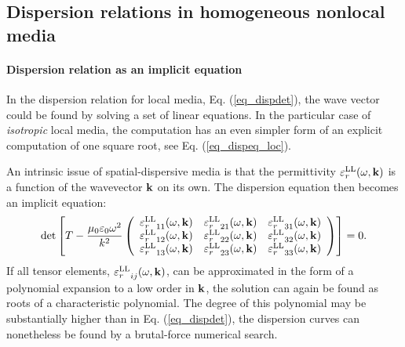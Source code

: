 \subsection{Dispersion relations in homogeneous nonlocal media} 
\paragraph{Dispersion relation as an implicit equation} %
In the dispersion relation for local media, Eq. (\ref{eq_dispdet}), the wave vector could be found by solving a set of linear equations. In the particular case of \textit{isotropic} local media, the computation has an even simpler form of an explicit computation of one square root, see Eq. (\ref{eq_dispeq_loc}).

An intrinsic issue of spatial-dispersive media is that the permittivity $\varepsilon_r^\text{LL}(\omega,{\mathbf{k}})$ is a function of the wavevector ${\mathbf{k}}$ on its own. The dispersion equation then becomes an implicit equation: 
\begin{equation} 
\det\left[
T -
	\frac{\mu_0 \varepsilon_0 \omega^2}{k^2}
	\left(\begin{array}{ccc} 
	{\varepsilon_r^\text{LL}}_{11}(\omega,{\mathbf{k}}) & {\varepsilon_r^\text{LL}}_{21}(\omega,{\mathbf{k}}) & {\varepsilon_r^\text{LL}}_{31}(\omega,{\mathbf{k}})  \\
	{\varepsilon_r^\text{LL}}_{12}(\omega,{\mathbf{k}}) & {\varepsilon_r^\text{LL}}_{22}(\omega,{\mathbf{k}}) & {\varepsilon_r^\text{LL}}_{32}(\omega,{\mathbf{k}})  \\
	{\varepsilon_r^\text{LL}}_{13}(\omega,{\mathbf{k}}) & {\varepsilon_r^\text{LL}}_{23}(\omega,{\mathbf{k}}) & {\varepsilon_r^\text{LL}}_{33}(\omega,{\mathbf{k}})  
	\end{array} \right) \right] = 0. \label{eq_dispdetLL}\end{equation}
If all tensor elements, ${\varepsilon_r^\text{LL}}_{ij}(\omega,{\mathbf{k}})$, can be approximated in the form of a polynomial expansion to a low order in ${\mathbf{k}}$, the solution can again be found as roots of a characteristic polynomial. The degree of this polynomial may be substantially higher than in Eq. (\ref{eq_dispdet}), the dispersion curves can nonetheless be found by a brutal-force numerical search. %
